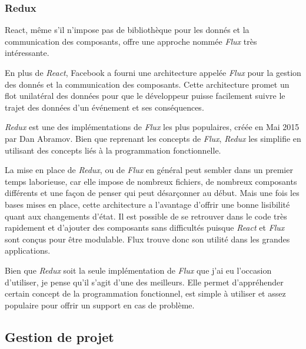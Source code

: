 \documentclass[12pt,a4paper]{article}
\begin{document}
  \bigskip

  \subsubsection{Redux}\label{redux}

  \bigskip

  React, même s'il n'impose pas de bibliothèque pour les donnés et la
  communication des composants, offre une approche nommée \emph{Flux} très
  intéressante.

  \bigskip

  En plus de \emph{React}, Facebook a fourni une architecture appelée
  \emph{Flux} pour la gestion des donnés et la communication des
  composants. Cette architecture promet un flot unilatéral des données
  pour que le développeur puisse facilement suivre le trajet des données
  d'un événement et ses conséquences.

  \bigskip

  \emph{Redux} est une des implémentations de \emph{Flux} les plus
  populaires, créée en Mai 2015 par Dan Abramov. Bien que reprenant les
  concepts de \emph{Flux}, \emph{Redux} les simplifie en utilisant des
  concepts liés à la programmation fonctionnelle.

  \bigskip

  La mise en place de \emph{Redux}, ou de \emph{Flux} en général peut
  sembler dans un premier temps laborieuse, car elle impose de nombreux
  fichiers, de nombreux composants différents et une façon de penser qui
  peut désarçonner au début. Mais une fois les bases mises en place, cette
  architecture a l'avantage d'offrir une bonne lisibilité quant aux
  changements d'état. Il est possible de se retrouver dans le code très
  rapidement et d'ajouter des composants sans difficultés puisque
  \emph{React} et \emph{Flux} sont conçus pour être modulable. Flux trouve
  donc son utilité dans les grandes applications.

  \bigskip

  Bien que \emph{Redux} soit la seule implémentation de \emph{Flux} que
  j'ai eu l'occasion d'utiliser, je pense qu'il s'agit d'une des
  meilleurs. Elle permet d'appréhender certain concept de la programmation
  fonctionnel, est simple à utiliser et assez populaire pour offrir un
  support en cas de problème.

  \bigskip

  \subsection{Gestion de projet}\label{gestion-de-projet}
\end{document}
